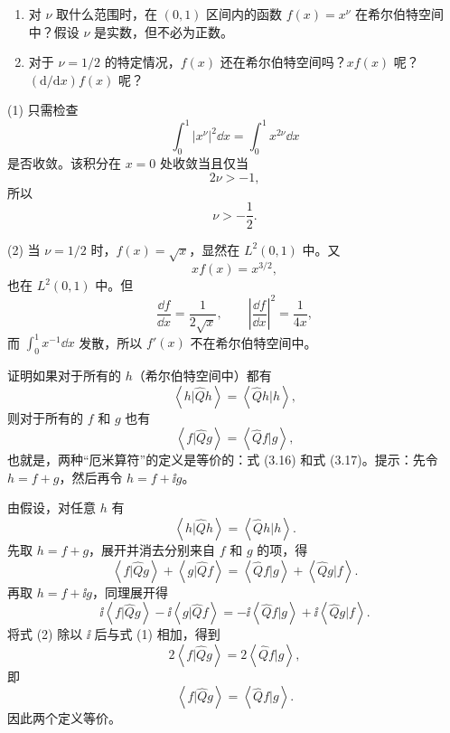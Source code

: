 \begin{question}
\begin{enumerate}
\item 对 $\nu$ 取什么范围时，在 $(0,1)$ 区间内的函数 $f(x)=x^\nu$ 在希尔伯特空间中？假设 $\nu$ 是实数，但不必为正数。
\item 对于 $\nu=1/2$ 的特定情况，$f(x)$ 还在希尔伯特空间吗？$x f(x)$ 呢？$(\mathrm d/\mathrm dx)f(x)$ 呢？
\end{enumerate}
\end{question}
\begin{solution}
(1) 只需检查
\[
\int_0^1 |x^\nu|^2\dd x=\int_0^1 x^{2\nu}\dd x
\]
是否收敛。该积分在 $x=0$ 处收敛当且仅当
\[
2\nu>-1,
\]
所以
\[
\boxed{\nu>-\frac12.}
\]

(2) 当 $\nu=1/2$ 时，$f(x)=\sqrt{x}$，显然在 $L^2(0,1)$ 中。又
\[
xf(x)=x^{3/2},
\]
也在 $L^2(0,1)$ 中。但
\[
\frac{\dd f}{\dd x}=\frac1{2\sqrt{x}},
\qquad
\left|\frac{\dd f}{\dd x}\right|^2=\frac1{4x},
\]
而 $\int_0^1 x^{-1}\dd x$ 发散，所以 $f'(x)$ 不在希尔伯特空间中。
\end{solution}

\begin{question}
证明如果对于所有的 $h$（希尔伯特空间中）都有
\[
\left\langle h|\hat Q h \right\rangle=\left\langle \hat Q h|h \right\rangle,
\]
则对于所有的 $f$ 和 $g$ 也有
\[
\left\langle f|\hat Q g \right\rangle=\left\langle \hat Q f|g \right\rangle,
\]
也就是，两种“厄米算符”的定义是等价的：式 (3.16) 和式 (3.17)。提示：先令 $h=f+g$，然后再令 $h=f+\ii g$。

\par\smallskip
{}

\end{question}
\begin{solution}
由假设，对任意 $h$ 有
\[
\left\langle h|\hat Qh \right\rangle=\left\langle \hat Qh|h \right\rangle.
\]
先取 $h=f+g$，展开并消去分别来自 $f$ 和 $g$ 的项，得
\[
\left\langle f|\hat Q g \right\rangle+\left\langle g|\hat Q f \right\rangle
=\left\langle \hat Q f|g \right\rangle+\left\langle \hat Q g|f \right\rangle.\tag{1}
\]
再取 $h=f+\ii g$，同理展开得
\[
\ii\left\langle f|\hat Q g \right\rangle-\ii\left\langle g|\hat Q f \right\rangle
=-\ii\left\langle \hat Q f|g \right\rangle+\ii\left\langle \hat Q g|f \right\rangle.\tag{2}
\]
将式 (2) 除以 $\ii$ 后与式 (1) 相加，得到
\[
2\left\langle f|\hat Qg \right\rangle=2\left\langle \hat Q f|g \right\rangle,
\]
即
\[
\boxed{\left\langle f|\hat Qg \right\rangle=\left\langle \hat Q f|g \right\rangle}.
\]
因此两个定义等价。
\end{solution}

